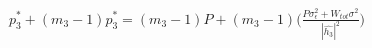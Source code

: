 \documentclass[preview]{standalone}
\begin{document}
\begin{align*}
p_3^\ast + \left(m_3 - 1\right) p_3^\ast = \left(m_3 - 1\right) P + \left(m_3 - 1\right) \Bigg( \frac{P \sigma_\epsilon^2 + W_{tot} \sigma^2 }{ \left| \hat{h_3} \right| ^2 } \Bigg)
\end{align*}
\end{document}

